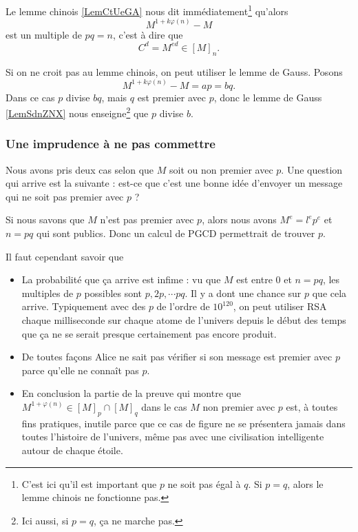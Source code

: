 Le lemme chinois \ref{LemCtUeGA} nous dit immédiatement\footnote{C'est ici qu'il est important que \( p\) ne soit pas égal à \( q\). Si \( p=q\), alors le lemme chinois ne fonctionne pas.} qu'alors
\begin{equation}
    M^{1+k\varphi(n)}-M
\end{equation}
est un multiple de \( pq=n\), c'est à dire que
\begin{equation}
    C^d=M^{ed}\in [M]_n.
\end{equation}

Si on ne croit pas au lemme chinois, on peut utiliser le lemme de Gauss. Posons
\begin{equation}
    M^{1+k\varphi(n)}-M=ap=bq.
\end{equation}
Dans ce cas \( p\) divise \( bq\), mais \( q\) est premier avec \( p\), donc le lemme de Gauss \ref{LemSdnZNX} nous enseigne\footnote{Ici aussi, si \( p=q\), ça ne marche pas.} que \( p\) divise \( b\).

\subsubsection{Une imprudence à ne pas commettre}

Nous avons pris deux cas selon que \( M\) soit ou non premier avec \( p\). Une question qui arrive est la suivante : est-ce que c'est une bonne idée d'envoyer un message qui ne soit pas premier avec \( p\) ?

Si nous savons que \( M\) n'est pas premier avec \( p\), alors nous avons \( M^e=l^ep^e\) et \( n=pq\) qui sont publics. Donc un calcul de PGCD permettrait de trouver \( p\).

Il faut cependant savoir que 
\begin{itemize}
    \item La probabilité que ça arrive est infime : vu que \( M\) est entre \( 0\) et \( n=pq\), les multiples de \( p\) possibles sont \( p,2p,\cdots pq\). Il y a dont une chance sur \( p\) que cela arrive. Typiquement avec des \( p\) de l'ordre de \( 10^{120}\), on peut utiliser RSA chaque milliseconde sur chaque atome de l'univers depuis le début des temps que ça ne se serait presque certainement pas encore produit.
    \item
        De toutes façons Alice ne sait pas vérifier si son message est premier avec \( p\) parce qu'elle ne connaît pas \( p\).
    \item 
        En conclusion la partie de la preuve qui montre que \( M^{1+\varphi(n)}\in [M]_p\cap[M]_q\) dans le cas \( M\) non premier avec \( p\) est, à toutes fins pratiques, inutile parce que ce cas de figure ne se présentera jamais dans toutes l'histoire de l'univers, même pas avec une civilisation intelligente autour de chaque étoile.
\end{itemize}

